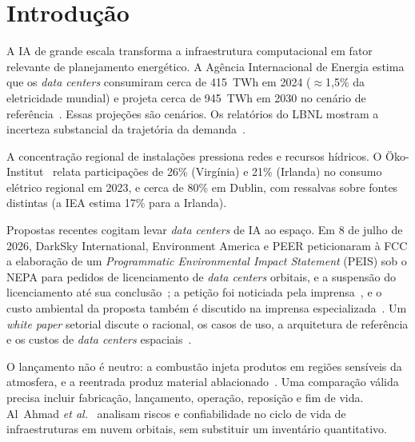 \documentclass[11pt,a4paper]{article}
\begin{document}
\bigskip
\section{Introdução}

A IA de grande escala transforma a infraestrutura computacional em fator
relevante de planejamento energético. A Agência Internacional de Energia
estima que os \emph{data centers} consumiram cerca de 415~TWh em 2024
($\approx$1,5\% da eletricidade mundial) e projeta cerca de 945~TWh em 2030 no
cenário de referência~\cite{r5}. Essas projeções são cenários. Os relatórios do
LBNL mostram a incerteza substancial da trajetória da demanda~\cite{r6,r7}.

A concentração regional de instalações pressiona redes e recursos hídricos. O
Öko-Institut~\cite{r8} relata participações de 26\% (Virgínia) e 21\% (Irlanda)
no consumo elétrico regional em 2023, e cerca de 80\% em Dublin, com ressalvas
sobre fontes distintas (a IEA estima 17\% para a Irlanda).

Propostas recentes cogitam levar \emph{data centers} de IA ao espaço. Em 8 de
julho de 2026, DarkSky International, Environment America e PEER peticionaram à
FCC a elaboração de um \emph{Programmatic Environmental Impact Statement} (PEIS)
sob o NEPA para pedidos de licenciamento de \emph{data centers} orbitais, e a
suspensão do licenciamento até sua conclusão~\cite{r50}; a petição foi
noticiada pela imprensa~\cite{r24}, e o custo ambiental da proposta também é
discutido na imprensa especializada~\cite{r23}. Um \emph{white paper} setorial
discute o racional, os casos de uso, a arquitetura de referência e os custos de
\emph{data centers} espaciais~\cite{r20}.

O lançamento não é neutro: a combustão injeta produtos em regiões sensíveis da
atmosfera, e a reentrada produz material ablacionado~\cite{r13,r14,r15,r16}.
Uma comparação válida precisa incluir fabricação, lançamento, operação,
reposição e fim de vida. Al~Ahmad \emph{et al.}~\cite{r17} analisam riscos e
confiabilidade no ciclo de vida de infraestruturas em nuvem orbitais, sem
substituir um inventário quantitativo.
\end{document}
